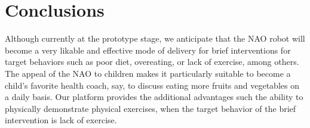 \documentclass[letterpaper]{article}
\begin{document}
\section*{Conclusions} 

Although currently at the prototype stage, we anticipate that the NAO robot will become a very 
likable and effective mode of delivery for brief interventions for target behaviors such as poor 
diet, overeating, or lack of exercise, among others.  The appeal of the NAO to children 
\cite{belpaeme2012multimodal} makes it particularly suitable to become a child's favorite health 
coach, say, to discuss eating more fruits and vegetables on a daily basis. Our platform 
provides the additional advantages such the ability to physically demonstrate physical exercises, when the target behavior of the brief intervention is lack of exercise.

       
   
\end{document}
